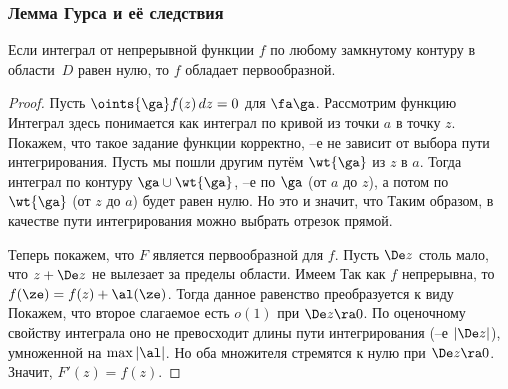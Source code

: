 \documentclass[a4paper]{article}
\begin{document}
\subsubsection{Лемма Гурса и её следствия}

\begin{stm}
Если интеграл от непрерывной функции $f$ по любому замкнутому контуру в области~$D$ равен нулю, то
$f$ обладает первообразной.
\end{stm}
\begin{proof}
Пусть $\oints{\ga}f(z)\,dz=0$ для $\fa \ga$. Рассмотрим функцию
Интеграл здесь понимается как интеграл по кривой из точки $a$ в точку $z$.
Покажем, что такое задание функции корректно, --е не зависит от выбора пути интегрирования.
Пусть мы пошли другим путём $\wt{\ga}$ из $z$ в $a$. Тогда интеграл по контуру
$\ga \cup \wt{\ga}$, --е по $\ga$ (от $a$ до $z$), а потом по $\wt{\ga}$ (от $z$ до $a$) будет равен нулю.
Но это и значит, что
Таким образом, в качестве пути интегрирования можно выбрать отрезок прямой.

Теперь покажем, что $F$ является первообразной для $f$. Пусть $\De z$ столь мало, что $z + \De z$ не вылезает за пределы области.
Имеем
Так как $f$ непрерывна, то $f(\ze) = f(z) + \al(\ze)$. Тогда данное равенство преобразуется к виду
Покажем, что второе слагаемое есть $o(1)$ при $\De z \ra 0$. По оценочному свойству интеграла
оно не превосходит длины пути интегрирования (--е $|\De z|$), умноженной на $\max|\al|$. Но оба множителя стремятся к нулю
при $\De z \ra 0$. Значит, $F'(z)=f(z)$.
\end{proof}
\end{document}
